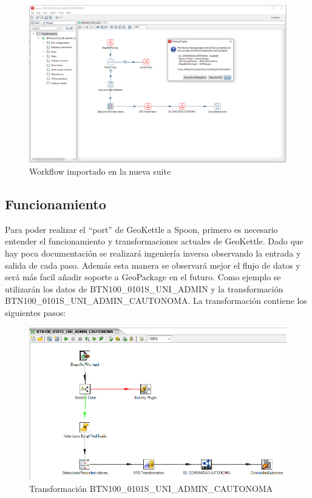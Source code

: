 \begin{figure}[h]
    \includegraphics[width=\textwidth]{images/spoon-missing-plugins.png}
    \centering
    \caption{Workflow importado en la nueva suite}
    \label{fig:spoon-missing-plugins}
\end{figure}

\newpage
\subsection{Funcionamiento}

Para poder realizar el ``port'' de GeoKettle a Spoon, primero es necesario entender el funcionamiento y
transformaciones actuales de GeoKettle. Dado que hay poca documentación se realizará ingeniería inversa observando
la entrada y salida de cada paso. Además esta manera se observará mejor el flujo de datos y será más facil añadir
soporte a GeoPackage en el futuro. Como ejemplo se utilizarán los datos de BTN100\_0101S\_UNI\_ADMIN y la
transformación BTN100\_0101S\_UNI\_ADMIN\_CAUTONOMA. La
transformación contiene los siguientes pasos:

\begin{figure}[h]
    \includegraphics[width=\textwidth]{images/CCAA.png}
    \centering
    \caption{Transformación BTN100\_0101S\_UNI\_ADMIN\_CAUTONOMA}
    \label{fig:CCAA}
\end{figure}


